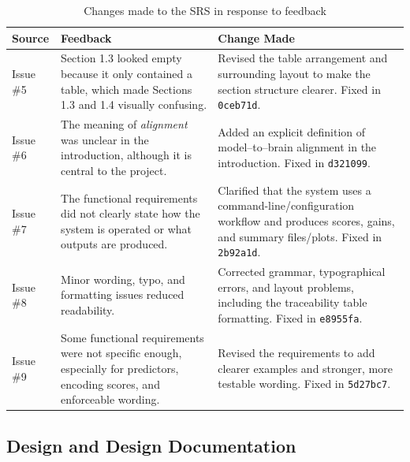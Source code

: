 \documentclass{article}
\begin{document}
\begin{table}[H]
\centering
\footnotesize
\renewcommand{\arraystretch}{1.05}
\caption{Changes made to the SRS in response to feedback}
\label{tab:srs-feedback}
\begin{tabularx}{0.96\textwidth}{p{1.6cm} p{4.0cm} X}
\toprule
\textbf{Source} & \textbf{Feedback} & \textbf{Change Made} \\
\midrule

Issue \#5 &
Section 1.3 looked empty because it only contained a table, which made Sections 1.3 and 1.4 visually confusing. &
Revised the table arrangement and surrounding layout to make the section structure clearer. Fixed in \texttt{0ceb71d}. \\

Issue \#6 &
The meaning of \emph{alignment} was unclear in the introduction, although it is central to the project. &
Added an explicit definition of model--to--brain alignment in the introduction. Fixed in \texttt{d321099}. \\

Issue \#7 &
The functional requirements did not clearly state how the system is operated or what outputs are produced. &
Clarified that the system uses a command-line/configuration workflow and produces scores, gains, and summary files/plots. Fixed in \texttt{2b92a1d}. \\

Issue \#8 &
Minor wording, typo, and formatting issues reduced readability. &
Corrected grammar, typographical errors, and layout problems, including the traceability table formatting. Fixed in \texttt{e8955fa}. \\

Issue \#9 &
Some functional requirements were not specific enough, especially for predictors, encoding scores, and enforceable wording. &
Revised the requirements to add clearer examples and stronger, more testable wording. Fixed in \texttt{5d27bc7}. \\

\bottomrule
\end{tabularx}
\end{table}







\subsection{Design and Design Documentation}
\end{document}
